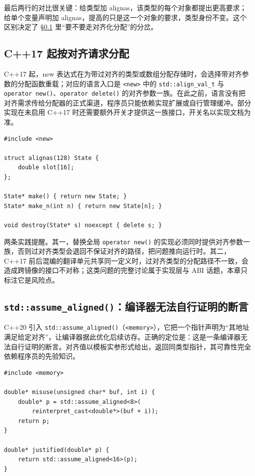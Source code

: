 \documentclass[12pt,a4paper,fontset=fandol]{ctexbook}
\newcommand{\cpp}[1]{C++#1}
\newcommand{\Fn}[1]{\texttt{#1()}}
\newcommand{\Tp}[1]{\texttt{#1}}
\newcommand{\Lang}[1]{\textsf{#1}}
\newcommand{\Hdr}[1]{\texttt{<#1>}}
\begin{document}
最后两行的对比很关键：给类型加 \Lang{alignas}，该类型的每个对象都提出更高要求；给单个变量声明加 \Lang{alignas}，提高的只是这一个对象的要求，类型身份不变。这个区别决定了 §\ref{sec:ub07-aligned-new} 里“要不要走对齐化分配”的分岔。

\subsection{\cpp{17} 起按对齐请求分配}\label{sec:ub07-aligned-new}

\cpp{17} 起，\Lang{new} 表达式在为带过对齐的类型或数组分配存储时，会选择带对齐参数的分配函数重载；对应的语言入口是 \Hdr{new} 中的 \Tp{std::align\_val\_t} 与 \Fn{operator new}、\Fn{operator delete} 的对齐参数一族。在此之前，语言没有把对齐需求传给分配器的正式渠道，程序员只能依赖实现扩展或自行管理缓冲。部分实现在未启用 \cpp{17} 时还需要额外开关才提供这一族接口，开关名以实现文档为准。

\begin{lstlisting}[style=cppstyle,caption={过对齐类型经 new 分配时，对齐要求自动进入分配请求}]
#include <new>

struct alignas(128) State {
    double slot[16];
};

State* make() { return new State; }
State* make_n(int n) { return new State[n]; }

void destroy(State* s) noexcept { delete s; }
\end{lstlisting}

两条实践提醒。其一，替换全局 \Fn{operator new} 的实现必须同时提供对齐参数一族，否则过对齐类型会退回不保证对齐的路径，把问题推向运行时。其二，\cpp{17} 前后混编的翻译单元共享同一定义时，过对齐类型的分配路径不一致，会造成跨镜像的接口不对称；这类问题的完整讨论属于实现层与 ABI 话题，本章只标注它是风险点。

\subsection{\Fn{std::assume\_aligned}：编译器无法自行证明的断言}\label{sec:ub07-assume-aligned}

\cpp{20} 引入 \Fn{std::assume\_aligned}（\Hdr{memory}），它把一个指针声明为“其地址满足给定对齐”，让编译器据此优化后续访存。正确的定位是：这是一条编译器无法自行证明的断言。对齐值以模板实参形式给出，返回同类型指针，其可靠性完全依赖程序员的先验知识。

\begin{lstlisting}[style=cppstyle,caption={同一个断言，一个必然不成立、一个可能成立，差别只在地址来源}]
#include <memory>

double* misuse(unsigned char* buf, int i) {
    double* p = std::assume_aligned<8>(
        reinterpret_cast<double*>(buf + i));
    return p;
}

double* justified(double* p) {
    return std::assume_aligned<16>(p);
}
\end{lstlisting}
\end{document}

